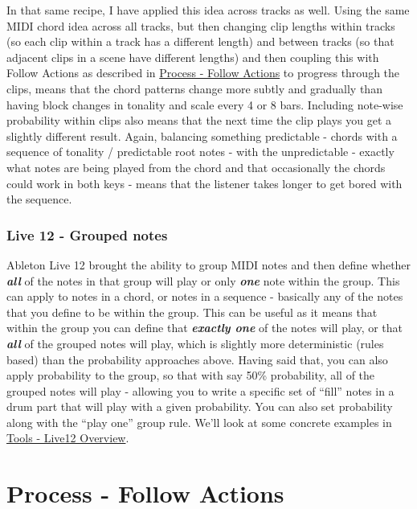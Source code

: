\documentclass[
  12pt,
  letterpaper,
  oneside,
  open=any]{scrbook}
\begin{document}
In that same recipe, I have applied this idea across tracks as well.
Using the same MIDI chord idea across all tracks, but then changing clip
lengths within tracks (so each clip within a track has a different
length) and between tracks (so that adjacent clips in a scene have
different lengths) and then coupling this with Follow Actions as
described in \hyperref[003-Process-Follow_Actions]{Process - Follow
Actions} to progress through the clips, means that the chord patterns
change more subtly and gradually than having block changes in tonality
and scale every 4 or 8 bars. Including note-wise probability within
clips also means that the next time the clip plays you get a slightly
different result. Again, balancing something predictable - chords with a
sequence of tonality / predictable root notes - with the unpredictable -
exactly what notes are being played from the chord and that occasionally
the chords could work in both keys - means that the listener takes
longer to get bored with the sequence.

\subsection{Live 12 - Grouped notes}\label{live-12---grouped-notes}

Ableton Live 12 brought the ability to group MIDI notes and then define
whether \textbf{\emph{all}} of the notes in that group will play or only
\textbf{\emph{one}} note within the group. This can apply to notes in a
chord, or notes in a sequence - basically any of the notes that you
define to be within the group. This can be useful as it means that
within the group you can define that \textbf{\emph{exactly one}} of the
notes will play, or that \textbf{\emph{all}} of the grouped notes will
play, which is slightly more deterministic (rules based) than the
probability approaches above. Having said that, you can also apply
probability to the group, so that with say 50\% probability, all of the
grouped notes will play - allowing you to write a specific set of
``fill'' notes in a drum part that will play with a given probability.
You can also set probability along with the ``play one'' group rule.
We'll look at some concrete examples in
\hyperref[030-Tools-Live12_Intro]{Tools - Live12 Overview}.


\chapter{Process - Follow Actions}\label{003-Process-Follow_Actions}
\end{document}
